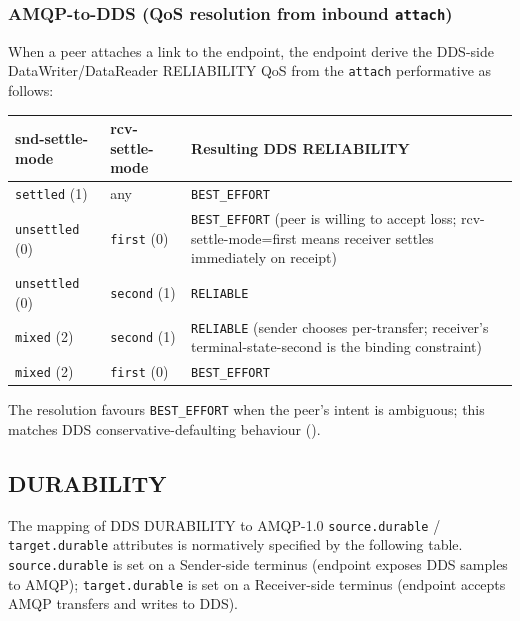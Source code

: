 \documentclass{../styles/zerodds-vendor-spec}
\begin{document}
\subsubsection{AMQP-to-DDS (QoS resolution from inbound \texttt{attach})}

When a peer attaches a link to the endpoint, the endpoint
 derive the DDS-side DataWriter/DataReader
RELIABILITY QoS from the \texttt{attach} performative as
follows:

\begin{longtable}{p{3.0cm}p{2.4cm}p{6.6cm}}
  \toprule
  \textbf{snd-settle-mode} & \textbf{rcv-settle-mode} & \textbf{Resulting DDS RELIABILITY} \\
  \midrule
  \endhead
  \texttt{settled} (1) & any & \texttt{BEST\_EFFORT} \\
  \texttt{unsettled} (0) & \texttt{first} (0) & \texttt{BEST\_EFFORT} (peer is willing to accept loss; rcv-settle-mode=first means receiver settles immediately on receipt) \\
  \texttt{unsettled} (0) & \texttt{second} (1) & \texttt{RELIABLE} \\
  \texttt{mixed} (2) & \texttt{second} (1) & \texttt{RELIABLE} (sender chooses per-transfer; receiver's terminal-state-second is the binding constraint) \\
  \texttt{mixed} (2) & \texttt{first} (0) & \texttt{BEST\_EFFORT} \\
  \bottomrule
\end{longtable}

\begin{specnote}
The resolution favours \texttt{BEST\_EFFORT} when the peer's
intent is ambiguous; this matches DDS conservative-defaulting
behaviour ().
\end{specnote}

\subsection{DURABILITY}

The mapping of DDS DURABILITY to AMQP-1.0
\texttt{source.durable} / \texttt{target.durable} attributes is
normatively specified by the following table.
\texttt{source.durable} is set on a Sender-side terminus
(endpoint exposes DDS samples to AMQP); \texttt{target.durable}
is set on a Receiver-side terminus (endpoint accepts AMQP
transfers and writes to DDS).
\end{document}
